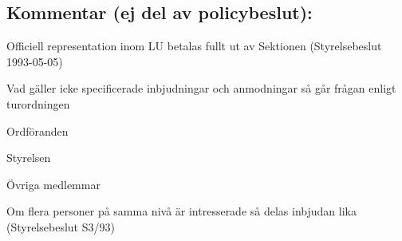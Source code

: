 \documentclass[../_main/handlingar.tex]{subfiles}
\begin{document}
\newpage
\subsection*{Kommentar (ej del av policybeslut):}
\begin{dashlist}
\item Officiell representation inom LU betalas fullt ut av Sektionen
(Styrelsebeslut 1993-05-05)
\item Vad gäller icke specificerade inbjudningar och anmodningar så går
frågan enligt turordningen
\begin{numplist}
\item Ordföranden
\item Styrelsen
\item Övriga medlemmar
\end{numplist}
\item Om flera personer på samma nivå är intresserade så delas inbjudan lika
(Styrelsebeslut S3/93)
\end{dashlist}
\newpage
\end{document}
